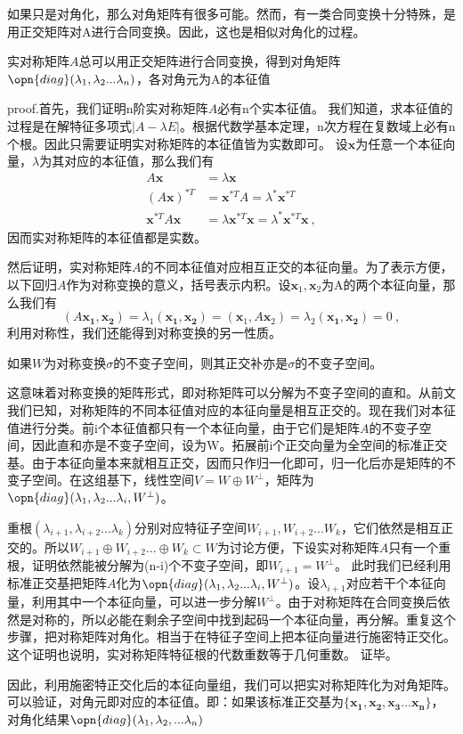 如果只是对角化，那么对角矩阵有很多可能。然而，有一类合同变换十分特殊，是用正交矩阵对A进行合同变换。因此，这也是相似对角化的过程。
\begin{theorem}{}
实对称矩阵$A$总可以用正交矩阵进行合同变换，得到对角矩阵$\opn{diag}(\lambda_1,\lambda_2...\lambda_n)$，各对角元为A的本征值
\end{theorem}  

proof.首先，我们证明n阶实对称矩阵$A$必有n个实本征值。
我们知道，求本征值的过程是在解特征多项式$|A-\lambda E|$。根据代数学基本定理，n次方程在复数域上必有n个根。因此只需要证明实对称矩阵的本征值皆为实数即可。
设$\boldsymbol x$为任意一个本征向量，$\lambda$为其对应的本征值，那么我们有
\begin{equation}
\begin{aligned}
A\boldsymbol x&=\lambda \boldsymbol x\\
(A\boldsymbol x)^{*T}&=\boldsymbol x^{*T}A=\lambda^{*}\boldsymbol x^{*T}\\
\boldsymbol x^{*T}A\boldsymbol x&=\lambda \boldsymbol x^{*T}\boldsymbol x=\lambda^{*}\boldsymbol x^{*T}\boldsymbol x~,
\end{aligned}
\end{equation}
因而实对称矩阵的本征值都是实数。

然后证明，实对称矩阵$A$的不同本征值对应相互正交的本征向量。为了表示方便，以下回归$A$作为对称变换的意义，括号表示内积。设$\boldsymbol x_1,\boldsymbol x_2$为A的两个本征向量，那么我们有
$$(A\boldsymbol {x_1,x_2})=\lambda_1(\boldsymbol {x_1,x_2})=(\boldsymbol x_1,A\boldsymbol x_2)=\lambda_2(\boldsymbol{x_1,x_2})=0~,$$
利用对称性，我们还能得到对称变换的另一性质。
\begin{lemma}{}
如果$W$为对称变换$\sigma$的不变子空间，则其正交补亦是$\sigma$的不变子空间。
\end{lemma}
这意味着对称变换的矩阵形式，即对称矩阵可以分解为不变子空间的直和。从前文我们已知，对称矩阵的不同本征值对应的本征向量是相互正交的。现在我们对本征值进行分类。前i个本征值都只有一个本征向量，由于它们是矩阵$A$的不变子空间，因此直和亦是不变子空间，设为W。拓展前i个正交向量为全空间的标准正交基。由于本征向量本来就相互正交，因而只作归一化即可，归一化后亦是矩阵的不变子空间。在这组基下，线性空间$V=W\oplus W^{\perp}$，矩阵为$\opn{diag}(\lambda_1,\lambda_2...\lambda_i,W^{\perp})$。

重根$(\lambda_{i+1},\lambda_{i+2}...\lambda_k)$分别对应特征子空间$W_{i+1},W_{i+2}...W_k$，它们依然是相互正交的。所以$W_{i+1}\oplus W_{i+2}...\oplus W_k\subset W$为讨论方便，下设实对称矩阵$A$只有一个重根，证明依然能被分解为(n-i)个不变子空间，即$W_{i+1}=W^{\perp}$。
此时我们已经利用标准正交基把矩阵$A$化为$\opn{diag}(\lambda_1,\lambda_2...\lambda_i,W^{\perp})$。设$\lambda_{i+1}$对应若干个本征向量，利用其中一个本征向量，可以进一步分解$W^{\perp}$。由于对称矩阵在合同变换后依然是对称的，所以必能在剩余子空间中找到起码一个本征向量，再分解。重复这个步骤，把对称矩阵对角化。相当于在特征子空间上把本征向量进行施密特正交化。
这个证明也说明，实对称矩阵特征根的代数重数等于几何重数。
证毕。

因此，利用施密特正交化后的本征向量组，我们可以把实对称矩阵化为对角矩阵。可以验证，对角元即对应的本征值。即：如果该标准正交基为$\{\boldsymbol{x_1,x_2,x_3...x_n}\}$，对角化结果$\opn{diag}(\lambda_1,\lambda_2,...\lambda_n)$
